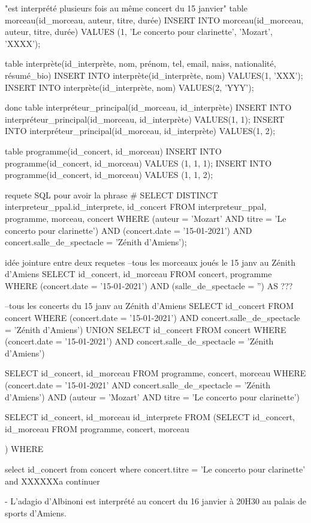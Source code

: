 \documentclass[12pt,a4paper]{article}
\begin{document}
{"est interprété plusieurs fois au même concert du 15 janvier"
table morceau(id_morceau, auteur, titre, durée)
INSERT INTO morceau(id_morceau, auteur, titre, durée) VALUES (1, 'Le concerto pour clarinette', 'Mozart', 'XXXX');

table interprète(id_interprète, nom, prénom, tel, email, naiss, nationalité, résumé_bio)
INSERT INTO interprète(id_interprète, nom) VALUES(1, 'XXX');
INSERT INTO interprète(id_interprète, nom) VALUES(2, 'YYY');

donc
table interpréteur_principal(id_morceau, id_interprète)
INSERT INTO interpréteur_principal(id_morceau, id_interprète) VALUES(1, 1);
INSERT INTO interpréteur_principal(id_morceau, id_interprète) VALUES(1, 2);

table programme(id_concert, id_morceau)
INSERT INTO programme(id_concert, id_morceau) VALUES (1, 1, 1);
INSERT INTO programme(id_concert, id_morceau) VALUES (1, 1, 2);

requete SQL pour avoir la phrase #
SELECT DISTINCT interpreteur_ppal.id_interprete, id_concert
FROM interpreteur_ppal, programme, morceau, concert
WHERE (auteur = 'Mozart' AND titre = 'Le concerto pour clarinette') 
	AND (concert.date = '15-01-2021') AND concert.salle_de_spectacle = 'Zénith d'Amiens');


idée jointure entre deux requetes
--tous les morceaux joués le 15 janv au Zénith d'Amiens
SELECT id_concert, id_morceau
FROM concert, programme
WHERE (concert.date = '15-01-2021') AND (salle_de_spectacle = '')
AS ???


--tous les concerts du 15 janv au Zénith d'Amiens
SELECT id_concert
FROM concert
WHERE (concert.date = '15-01-2021') AND concert.salle_de_spectacle = 'Zénith d'Amiens')
UNION
SELECT id_concert
FROM concert
WHERE (concert.date = '15-01-2021') AND concert.salle_de_spectacle = 'Zénith d'Amiens')


SELECT id_concert, id_morceau
FROM programme, concert, morceau
WHERE (concert.date = '15-01-2021' AND concert.salle_de_spectacle = 'Zénith d'Amiens')
	AND (auteur = 'Mozart' AND titre = 'Le concerto pour clarinette')


SELECT id_concert, id_morceau id_interprete
FROM (SELECT id_concert, id_morceau
		FROM programme, concert, morceau
		
     )
WHERE

select id_concert
from concert
where concert.titre = 'Le concerto pour clarinette' and XXXXXXa continuer



- L'adagio d'Albinoni est interprété au concert du 16 janvier à 20H30 au palais de sports d'Amiens.





}
\end{document}
